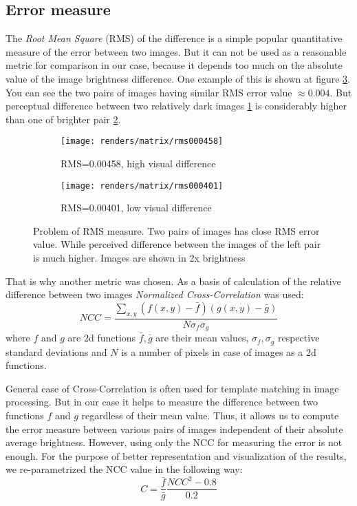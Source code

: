 \subsection{Error measure}
\label{section:error_measure}
The \emph{Root Mean Square} (RMS) of the difference is a simple popular quantitative measure of the
error between two images. But it can not be used as a reasonable metric for comparison in our case,
because it depends too much on the absolute value of the image brightness difference. One example of
this is shown at figure \ref{fig:wrong_rms}. You can see the two pairs of images having similar RMS
error value $\approx 0.004$. But perceptual difference between two relatively dark images
\ref{fig:wrong_rms_dark} is considerably higher than one of brighter pair
\ref{fig:wrong_rms_bright}.
\begin{figure}[h]
    \centering
    \begin{subfigure}{0.4\textwidth}
        \texttt{[image: renders/matrix/rms000458]}
        \caption{RMS=0.00458, high visual difference}
        \label{fig:wrong_rms_dark}
    \end{subfigure}
    \begin{subfigure}{0.4\textwidth}
        \texttt{[image: renders/matrix/rms000401]}
        \caption{RMS=0.00401, low visual difference}
        \label{fig:wrong_rms_bright}
    \end{subfigure}
    \caption{Problem of RMS measure. Two pairs of images has close RMS error value. While perceived
    difference between the images of the left pair is much higher. Images are shown in 2x
    brightness}
    \label{fig:wrong_rms}
\end{figure}

That is why another metric was chosen. As a basis of calculation of the relative difference
between two images \emph{Normalized Cross-Correlation} was used:
\[
NCC = \frac{\sum_{x,y} (f(x,y)-\bar{f})(g(x,y)-\bar{g})}{N\sigma_f\sigma_g}
\]
where $f$ and $g$ are 2d functions $\bar{f}, \bar{g}$ are their mean values, $\sigma_f,\sigma_g$
respective standard deviations and $N$ is a number of pixels in case of images as a 2d functions.

General case of Cross-Correlation is often used for template matching in image processing. But in
our case it helps to measure the difference between two functions $f$ and $g$ regardless of their
mean value. Thus, it allows us to compute the error measure between various pairs of images
independent of their absolute average brightness. However, using only the \gls{NCC} for measuring
the error is not enough. For the purpose of better representation and visualization of the results,
we re-parametrized the NCC value in the following way:
\begin{equation}
\label{eq:cvalue}
C = \frac{\bar{f}}{\bar{g}}\frac{NCC^2-0.8}{0.2}
\end{equation}

